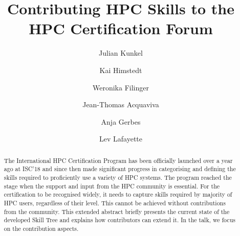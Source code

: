 \documentclass[jocse]{jocseart}
\begin{document}
\title{Contributing HPC Skills to the HPC Certification Forum}

\author{Julian Kunkel}


\author{Kai Himstedt}

\author{Weronika Filinger}

\author{Jean-Thomas Acquaviva}


\author{Anja Gerbes}

\author{Lev Lafayette}

\renewcommand{\shortauthors}{J. Kunkel et al.}


\begin{abstract}
The International HPC Certification Program has been officially launched over a year ago at ISC’18 and since then made significant progress in categorising and defining the skills required to proficiently use a variety of HPC systems. The program reached the stage when the support and input from the HPC community is essential. 
For the certification to be recognised widely, it needs to capture skills required by majority of HPC users, regardless of their level. This cannot be achieved without contributions from the community. This extended abstract briefly presents the current state of the developed Skill Tree and explains how contributors can extend it. 
In the talk, we focus on the contribution aspects.
\end{abstract}

%
%
\begin{CCSXML}
\end{CCSXML}



\keywords{}
\end{document}
